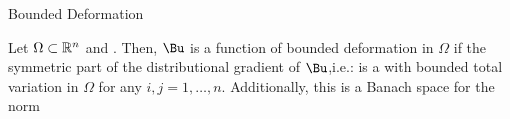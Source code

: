 \documentclass{beamer}
\begin{document}
\begin{frame}{Bounded Deformation}
    \begin{definition}
        Let $\Omega\subset\mathbb{R}^n$ and . Then, $\Bu$ is a function of bounded deformation in $\Omega$ if  the symmetric part of the distributional gradient of $\Bu$,i.e.:
        is a  with bounded total variation in $\Omega$ for any $i,j=1,\ldots,n$.
        \pause
        Additionally, this is a Banach space for the norm
    \end{definition} 
  

\end{frame}

\end{document}

